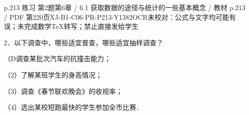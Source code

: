 \begin{bankitem}{p.213 练习 第2题}{第6章 / 6.1 获取数据的途径与统计的一些基本概念 / 教材 p.213 / PDF 第220页}{XJ-B1-C06-PR-P213-Y1382}{OCR未校对：公式与文字均可能有误；未完成数学TeX转写；禁止直接发给学生}
\begin{ocrdraft}
\par
2．以下调查中，哪些适宜普查，哪些适宜抽样调查？
\par
（D调查某批次汽车的抗撞击能力；
\par
（2）了解某班学生的身高情况；
\par
（3）调查《春节联欢晚会》的收视率；
\par
（4）选出某校短跑最快的学生参加全市比赛．
\end{ocrdraft}
\end{bankitem}
